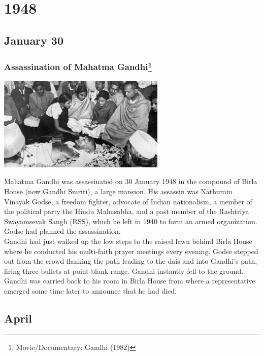 \documentclass[11pt]{report}
\begin{document}
\chapter{1948}
\section{January 30}
\subsection{Assassination of Mahatma Gandhi\protect\footnote{Movie/Documentary: Gandhi (1982)}}
\vspace{2mm}\begin{center}\includegraphics[width=8cm]{./img/gandhiDead.jpg}\end{center}
Mahatma Gandhi was assassinated on 30 January 1948 in the compound of Birla House (now Gandhi Smriti), a large mansion. His assassin was Nathuram Vinayak Godse, a freedom fighter, advocate of Indian nationalism, a member of the political party the Hindu Mahasabha, and a past member of the Rashtriya Swayamsevak Sangh (RSS), which he left in 1940 to form an armed organization. Godse had planned the assassination.\\
\indent Gandhi had just walked up the low steps to the raised lawn behind Birla House where he conducted his multi-faith prayer meetings every evening. Godse stepped out from the crowd flanking the path leading to the dais and into Gandhi's path, firing three bullets at point-blank range. Gandhi instantly fell to the ground. Gandhi was carried back to his room in Birla House from where a representative emerged some time later to announce that he had died.
\section{April}
\end{document}
